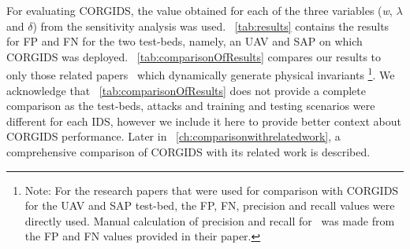 \begin{table}
\centering
  \caption{Comparison of Precision and Recall for OpenAPS platform}
  \label{tab:comparisonOfResults}
\end{table}

For evaluating \ac{CORGIDS}, the value obtained for each of the three variables (\textit{w}, $\lambda$ and $\delta$) from the sensitivity analysis was used. ~\autoref{tab:results} contains the results for \ac{FP} and \ac{FN} for the two test-beds, namely, an \ac{UAV} and \ac{SAP} on which \ac{CORGIDS} was deployed. ~\autoref{tab:comparisonOfResults} compares our results to only those related papers~\cite{chen2018learning,zohrevand2016hidden,aliabadi2017artinali} which dynamically generate physical invariants \footnote{Note: For the research papers that were used for comparison with \ac{CORGIDS} for the \ac{UAV} and \ac{SAP} test-bed, the \ac{FP}, \ac{FN}, precision and recall values were directly used. Manual calculation of precision and recall for~\cite{aliabadi2017artinali} was made from the \ac{FP} and \ac{FN} values provided in their paper.}. We acknowledge that ~\autoref{tab:comparisonOfResults} does not provide a complete comparison as the test-beds, attacks and training and testing scenarios were different for each \ac{IDS}, however we include it here to provide better context about \ac{CORGIDS} performance. Later in ~\autoref{ch:comparisonwithrelatedwork}, a comprehensive comparison of CORGIDS with its related work is described.

